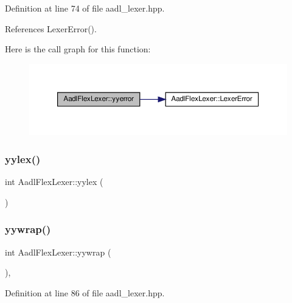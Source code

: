 Definition at line 74 of file aadl\+\_\+lexer.\+hpp.



References Lexer\+Error().

Here is the call graph for this function\+:
\nopagebreak
\begin{figure}[H]
\begin{center}
\leavevmode
\includegraphics[width=350pt]{d6/d56/classAadlFlexLexer_aac830c1b7622ca34e05bef9ae0689b03_cgraph}
\end{center}
\end{figure}
\mbox{\label{classAadlFlexLexer_a638b036ebe4596eada553be719ed0525}} 
\subsubsection{\texorpdfstring{yylex()}{yylex()}}
{\footnotesize\ttfamily int Aadl\+Flex\+Lexer\+::yylex (\begin{DoxyParamCaption}{ }\end{DoxyParamCaption})\hspace{0.3cm}{\ttfamily [override]}}

\mbox{\label{classAadlFlexLexer_aad5e18b201f066245445b520c54f570b}} 
\subsubsection{\texorpdfstring{yywrap()}{yywrap()}}
{\footnotesize\ttfamily int Aadl\+Flex\+Lexer\+::yywrap (\begin{DoxyParamCaption}{ }\end{DoxyParamCaption})\hspace{0.3cm}{\ttfamily [inline]}, {\ttfamily [override]}}



Definition at line 86 of file aadl\+\_\+lexer.\+hpp.



